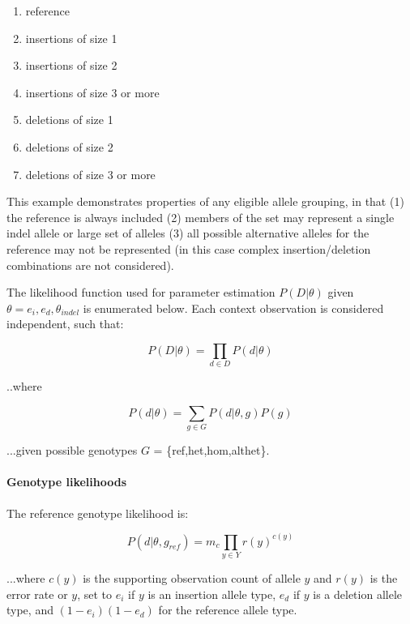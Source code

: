 \documentclass{article}
\begin{document}
\begin{enumerate}
\item reference
\item insertions of size 1
\item insertions of size 2
\item insertions of size 3 or more
\item deletions of size 1
\item deletions of size 2
\item deletions of size 3 or more
\end{enumerate}

This example demonstrates properties of any eligible allele grouping, in that (1) the reference is always included (2) members of the set may represent a single indel allele or large set of alleles (3) all possible alternative alleles for the reference may not be represented (in this case complex insertion/deletion combinations are not considered).

The likelihood function used for parameter estimation $P( D \vert \theta )$ given $\theta = {e_i,e_d,\theta_{indel}}$ is enumerated below. Each context observation is considered independent, such that:

\begin{equation}
\label{eq:indel_m2}
P(D \vert \theta) = \prod_{d \in D} P(d \vert \theta)
\end{equation}

..where

\begin{equation*}
P(d \vert \theta) = \sum_{g \in G} P(d \vert \theta, g) P(g)
\end{equation*}

...given possible genotypes $G$ = \{ref,het,hom,althet\}.

\paragraph{Genotype likelihoods}

The reference genotype likelihood is:

\begin{equation*}
P ( d \vert \theta, g_{ref}) = m_c \prod_{y \in Y} r(y)^{c(y)}
\end{equation*}

...where $c(y)$ is the supporting observation count of allele $y$ and $r(y)$ is the error rate or $y$, set to $e_i$ if $y$ is an insertion allele type, $e_d$ if $y$ is a deletion allele type, and $(1-e_i) (1-e_d)$ for the reference allele type.
\end{document}
